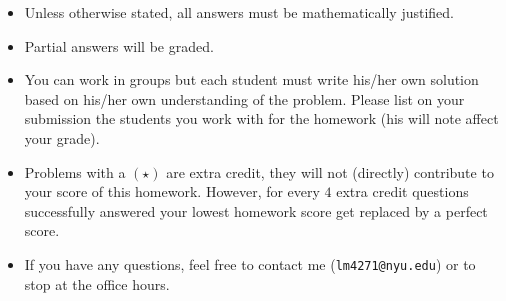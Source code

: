 \centerline{}
{\small
	\begin{itemize}
		\item Unless otherwise stated, all answers must be mathematically justified.
		\item Partial answers will be graded. 
		\item You can work in groups but each student must write his/her own solution based on his/her own understanding of the problem. Please list on your submission the students you work with for the homework (his will note affect your grade).
		\item Problems with a $(\star)$ are extra credit, they will not (directly) contribute to your score of this homework. However, for every $4$ extra credit questions successfully answered your lowest homework score get replaced by a perfect score.
		\item If you have any questions, feel free to contact me (\texttt{lm4271@nyu.edu}) or to stop at the office hours.
	\end{itemize}
}
\vspace{-0.4cm}
\centerline{}
\vspace{0.5cm}
